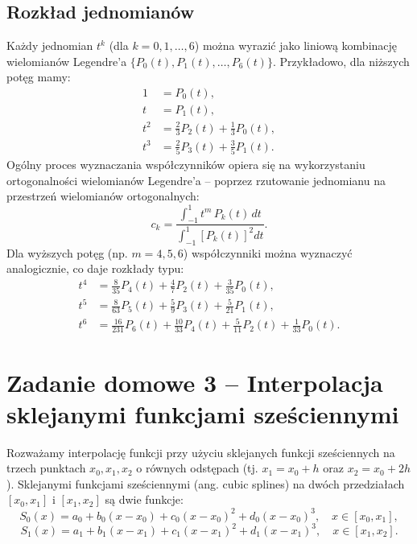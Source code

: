 \documentclass{article}
\begin{document}
\subsection{Rozkład jednomianów}
Każdy jednomian \( t^k \) (dla \( k=0,1,\dots,6 \)) można wyrazić jako liniową kombinację wielomianów Legendre’a \( \{P_0(t), P_1(t), \dots, P_6(t)\} \). Przykładowo, dla niższych potęg mamy:
\begin{align*}
1 &= P_0(t),\\[1mm]
t &= P_1(t),\\[1mm]
t^2 &= \frac{2}{3}P_2(t) + \frac{1}{3}P_0(t),\\[1mm]
t^3 &= \frac{2}{5}P_3(t) + \frac{3}{5}P_1(t).
\end{align*}
Ogólny proces wyznaczania współczynników opiera się na wykorzystaniu ortogonalności wielomianów Legendre’a – poprzez rzutowanie jednomianu na przestrzeń wielomianów ortogonalnych:
\[
c_k = \frac{\int_{-1}^{1} t^m\,P_k(t)\, dt}{\int_{-1}^{1} \left[P_k(t)\right]^2 dt}.
\]
Dla wyższych potęg (np. \( m=4,5,6 \)) współczynniki można wyznaczyć analogicznie, co daje rozkłady typu:
\begin{align*}
t^4 &= \frac{8}{35}P_4(t) + \frac{4}{7}P_2(t) + \frac{3}{35}P_0(t),\\[1mm]
t^5 &= \frac{8}{63}P_5(t) + \frac{5}{9}P_3(t) + \frac{5}{21}P_1(t),\\[1mm]
t^6 &= \frac{16}{231}P_6(t) + \frac{10}{33}P_4(t) + \frac{5}{11}P_2(t) + \frac{1}{33}P_0(t).
\end{align*}
\newpage
\section{Zadanie domowe 3 -- Interpolacja sklejanymi funkcjami sześciennymi}

Rozważamy interpolację funkcji przy użyciu sklejanych funkcji sześciennych na trzech punktach \( x_0, x_1, x_2 \) o równych odstępach (tj. \( x_1=x_0+h \) oraz \( x_2=x_0+2h \)). Sklejanymi funkcjami sześciennymi (ang. cubic splines) na dwóch przedziałach \([x_0,x_1]\) i \([x_1,x_2]\) są dwie funkcje:
\[
S_0(x)=a_0+b_0(x-x_0)+c_0(x-x_0)^2+d_0(x-x_0)^3,\quad x\in[x_0,x_1],
\]
\[
S_1(x)=a_1+b_1(x-x_1)+c_1(x-x_1)^2+d_1(x-x_1)^3,\quad x\in[x_1,x_2].
\]
\end{document}
